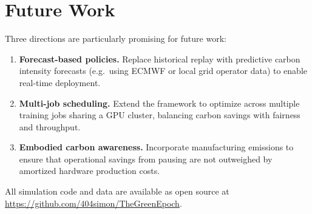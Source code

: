 \section{Future Work}

Three directions are particularly promising for future work:
\begin{enumerate}
  \item \textbf{Forecast-based policies.}  Replace historical replay with
    predictive carbon intensity forecasts (e.g.\ using ECMWF or local grid
    operator data) to enable real-time deployment.
  \item \textbf{Multi-job scheduling.}  Extend the framework to optimize across
    multiple training jobs sharing a GPU cluster, balancing carbon savings with
    fairness and throughput.
  \item \textbf{Embodied carbon awareness.}  Incorporate manufacturing
    emissions to ensure that operational savings from pausing are not
    outweighed by amortized hardware production costs.
\end{enumerate}

All simulation code and data are available as open source at
\url{https://github.com/404simon/TheGreenEpoch}.

